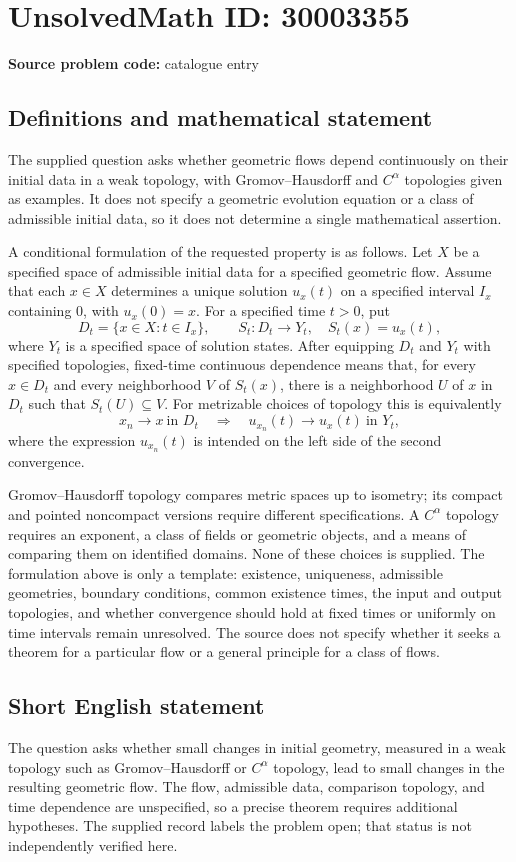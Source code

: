 \documentclass[11pt]{article}
\begin{document}
\section*{UnsolvedMath ID: 30003355}
\textbf{Source problem code:} catalogue entry
\subsection{Definitions and mathematical statement}
The supplied question asks whether geometric flows depend continuously on their initial data in a weak topology, with Gromov--Hausdorff and \(C^{\alpha}\) topologies given as examples. It does not specify a geometric evolution equation or a class of admissible initial data, so it does not determine a single mathematical assertion.

A conditional formulation of the requested property is as follows. Let \(X\) be a specified space of admissible initial data for a specified geometric flow. Assume that each \(x\in X\) determines a unique solution \(u_x(t)\) on a specified interval \(I_x\) containing \(0\), with \(u_x(0)=x\). For a specified time \(t>0\), put
\[
D_t=\{x\in X:t\in I_x\},\qquad S_t:D_t\longrightarrow Y_t,\quad S_t(x)=u_x(t),
\]
where \(Y_t\) is a specified space of solution states. After equipping \(D_t\) and \(Y_t\) with specified topologies, fixed-time continuous dependence means that, for every \(x\in D_t\) and every neighborhood \(V\) of \(S_t(x)\), there is a neighborhood \(U\) of \(x\) in \(D_t\) such that \(S_t(U)\subseteq V\). For metrizable choices of topology this is equivalently
\[
x_n\longrightarrow x\ \text{in }D_t
\quad\Longrightarrow\quad
u_{x_n}(t)\longrightarrow u_x(t)\ \text{in }Y_t,
\]
where the expression \(u_{x_n}(t)\) is intended on the left side of the second convergence.

Gromov--Hausdorff topology compares metric spaces up to isometry; its compact and pointed noncompact versions require different specifications. A \(C^{\alpha}\) topology requires an exponent, a class of fields or geometric objects, and a means of comparing them on identified domains. None of these choices is supplied. The formulation above is only a template: existence, uniqueness, admissible geometries, boundary conditions, common existence times, the input and output topologies, and whether convergence should hold at fixed times or uniformly on time intervals remain unresolved. The source does not specify whether it seeks a theorem for a particular flow or a general principle for a class of flows.
\subsection{Short English statement}
The question asks whether small changes in initial geometry, measured in a weak topology such as Gromov--Hausdorff or \(C^{\alpha}\) topology, lead to small changes in the resulting geometric flow. The flow, admissible data, comparison topology, and time dependence are unspecified, so a precise theorem requires additional hypotheses. The supplied record labels the problem open; that status is not independently verified here.
\end{document}
